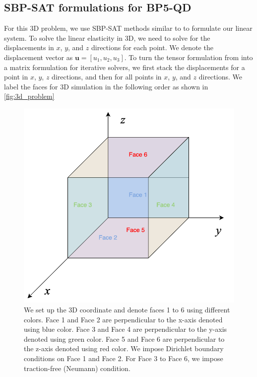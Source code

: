 \subsection{SBP-SAT formulations for BP5-QD}
For this 3D problem, we use SBP-SAT methods similar to \citep{ALMQUIST2021109842} to formulate our linear system.
To solve the linear elasticity in 3D, we need to solve for the displacements in $x$, $y$, and $z$ directions for each point.
We denote the displacement vector as $\boldsymbol{u} = [u_1, u_2, u_3]$.
To turn the tensor formulation from \citep{ALMQUIST2021109842} into a matrix formulation for iterative solvers,  we first stack the displacements for a point in $x$, $y$, $z$ directions, and then for all points in $x$, $y$, and $z$ directions.
We label the faces for 3D simulation in the following order as shown in \autoref{fig:3d_problem}

\begin{figure}
    \centering
    \includegraphics[width=\linewidth]{figures/3D_problem.png}
    \caption{We set up the 3D coordinate and denote faces 1 to 6 using different colors. Face 1 and Face 2 are perpendicular to the x-axis denoted using blue color. Face 3 and Face 4 are perpendicular to the y-axis denoted using green color. Face 5 and Face 6 are perpendicular to the z-axis denoted using red color. We impose Dirichlet boundary conditions on Face 1 and Face 2. For Face 3 to Face 6, we impose traction-free (Neumann) condition.} 
    \label{fig:3d_problem}
\end{figure}


